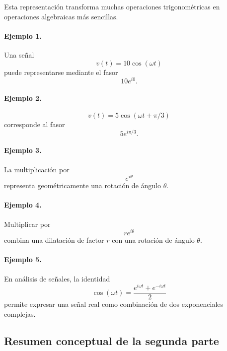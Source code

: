 Esta representación transforma muchas operaciones trigonométricas en
operaciones algebraicas más sencillas.

\paragraph{Ejemplo 1.}
Una señal
\[
v(t)=10\cos(\omega t)
\]
puede representarse mediante el fasor
\[
10e^{i0}.
\]

\paragraph{Ejemplo 2.}
\[
v(t)=5\cos(\omega t+\pi/3)
\]
corresponde al fasor
\[
5e^{i\pi/3}.
\]

\paragraph{Ejemplo 3.}
La multiplicación por
\[
e^{i\theta}
\]
representa geométricamente una rotación de ángulo $\theta$.

\paragraph{Ejemplo 4.}
Multiplicar por
\[
re^{i\theta}
\]
combina una dilatación de factor $r$ con una rotación de ángulo $\theta$.

\paragraph{Ejemplo 5.}
En análisis de señales, la identidad
\[
\cos(\omega t)
=
\frac{e^{i\omega t}+e^{-i\omega t}}{2}
\]
permite expresar una señal real como combinación de dos exponenciales
complejas.

\subsection{Resumen conceptual de la segunda parte}

